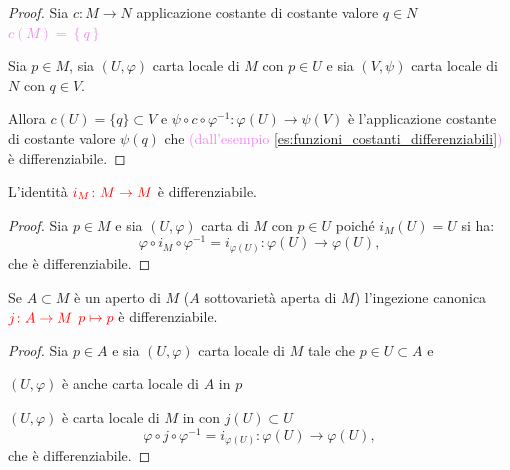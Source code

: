         \begin{proof}
        \mbox{}

        Sia $c \colon M \to N$ applicazione costante di costante valore $q \in N$ \textcolor{violet}{$c(M)=\left\{ q \right\}$}
        
        Sia $p \in M$, sia $(U, \varphi)$ carta locale di $M$ 
        con $p \in U$ e sia $(V, \psi)$ carta locale di $N$ con $q \in V$. 
        
        Allora $c(U) = \{q\} \subset V$ e 
        $\psi \circ c \circ \varphi^{-1} \colon \varphi(U) \to \psi(V)$ è l'applicazione costante di costante valore $\psi(q)$
        che \textcolor{violet}{(dall'esempio \ref{es:funzioni_costanti_differenziabili})} è differenziabile.
        \end{proof}
        \begin{proposizione}
        \mbox{}

        L'identità $\textcolor{red}{i_M \colon M \to M}$ è differenziabile.
        \end{proposizione}

        \begin{proof}
        \mbox{}

        Sia $p \in M$ e sia $(U, \varphi)$ carta di $M$ con $p \in U$ poiché $i_M(U) = U$ si ha:
        \[
        \varphi \circ i_M \circ \varphi^{-1} = i_{\varphi(U)} \colon \varphi(U) \to \varphi(U),
        \]
        che è differenziabile.
        \end{proof}
        \newpage
        \begin{proposizione}
        \label{prop:ingezione_canonica_tra_aperto_e_varieta_differenziabile}
        \mbox{}

        Se $A \subset M$ è un aperto di $M$ \textcolor{blu}{($A$ sottovarietà aperta di $M$)} l'ingezione canonica $\textcolor{red}{j \colon A \to M}$ 
        \textcolor{red}{$p \mapsto p$} è differenziabile.
        \end{proposizione}

        \begin{proof}
        \mbox{}

        Sia $p \in A$ e sia $(U, \varphi)$ carta locale di $M$ tale che $p \in U \subset A$ e
        
        $(U, \varphi)$ è anche carta locale di $A$ in $p$

        $(U, \varphi)$ è carta locale di $M$ in con $j(U) \subset U$
        \[
        \varphi \circ j \circ \varphi^{-1} = i_{\varphi(U)} \colon \varphi(U) \to \varphi(U),
        \]
        che è differenziabile.
        \end{proof}
        
